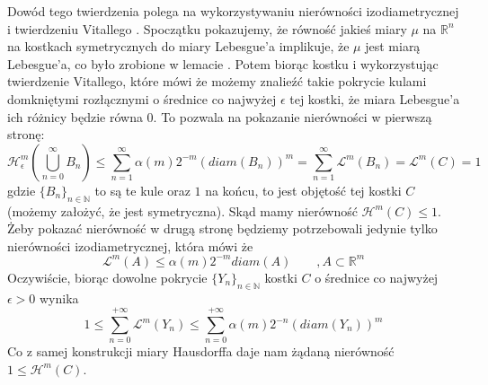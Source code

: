 Dowód tego twierdzenia polega na wykorzystywaniu nierówności izodiametrycznej \citep[2.10.3]{Federer} 
i twierdzeniu Vitallego \citep[2.8.18]{Federer}.
Spoczątku pokazujemy, że równość jakieś miary $\mu$ na $\mathbb{R}^n$ na kostkach symetrycznych do miary 
Lebesgue'a implikuje, że $\mu$ jest miarą Lebesgue'a, co było zrobione w lemacie \citep[3.35]{Tworzewski}.
Potem biorąc kostku i wykorzystując twierdzenie Vitallego, które mówi że możemy znalieźć takie pokrycie kulami domkniętymi
rozłącznymi o średnice co najwyżej $\epsilon$ tej kostki, że miara Lebesgue'a ich różnicy będzie równa 0. 
To pozwala na pokazanie nierówności w pierwszą stronę: 
$$ 
    \mathcal{H}^m_{\epsilon}(\bigcup_{n=0}^{\infty} B_n) 
    \leq \sum_{n=1}^{\infty} \alpha(m)2^{-m}(diam(B_n))^m 
    = \sum_{n=1}^{\infty} \mathcal{L}^m(B_n) 
    = \mathcal{L}^m(C)
    = 1
$$
gdzie $\{B_n\}_{n \in \mathbb{N}}$ to są te kule oraz $1$ na końcu, to jest objętość tej kostki $C$ (możemy założyć, że jest symetryczna). 
Skąd mamy nierówność $\mathcal{H}^m(C) \leq 1$. Żeby pokazać nierówność w drugą stronę będziemy potrzebowali jedynie tylko
nierówności izodiametrycznej, która mówi że 
$$
    \mathcal{L}^m(A) \leq \alpha(m)2^{-m}diam(A) \quad \quad , A \subset \mathbb{R}^m
$$
Oczywiście, biorąc dowolne pokrycie $\{Y_n\}_{n \in \mathbb{N}}$ kostki $C$ o średnice co najwyżej $\epsilon > 0$ wynika
$$ 
    1 
    \leq \sum_{n=0}^{+\infty} \mathcal{L}^m(Y_n) 
    \leq \sum_{n=0}^{+\infty} \alpha(m)2^{-n}(diam(Y_n))^m 
$$ 
Co z samej konstrukcji miary Hausdorffa daje nam żądaną nierówność $1 \leq \mathcal{H}^m(C)$.